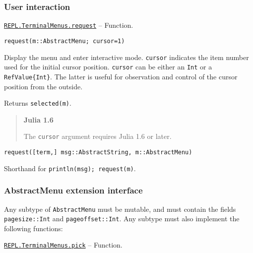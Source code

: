 \hypertarget{16911788964068219018}{}


\subsubsection{User interaction}


\hypertarget{6305836527176008123}{}
\hyperlink{6305836527176008123}{\texttt{REPL.TerminalMenus.request}}  -- {Function.}

\begin{adjustwidth}{2em}{0pt}


\begin{verbatim}
request(m::AbstractMenu; cursor=1)
\end{verbatim}

Display the menu and enter interactive mode. \texttt{cursor} indicates the item number used for the initial cursor position. \texttt{cursor} can be either an \texttt{Int} or a \texttt{RefValue\{Int\}}. The latter is useful for observation and control of the cursor position from the outside.

Returns \texttt{selected(m)}.

\begin{quote}
\textbf{Julia 1.6}

The \texttt{cursor} argument requires Julia 1.6 or later.

\end{quote}



\begin{lstlisting}
request([term,] msg::AbstractString, m::AbstractMenu)
\end{lstlisting}

Shorthand for \texttt{println(msg); request(m)}.



\end{adjustwidth}

\hypertarget{15332755986401681003}{}


\subsubsection{AbstractMenu extension interface}



Any subtype of \texttt{AbstractMenu} must be mutable, and must contain the fields \texttt{pagesize::Int} and \texttt{pageoffset::Int}. Any subtype must also implement the following functions:


\hypertarget{12243716978123992733}{}
\hyperlink{12243716978123992733}{\texttt{REPL.TerminalMenus.pick}}  -- {Function.}

